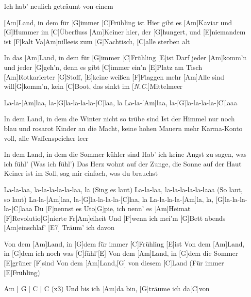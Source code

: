 

\begin{guitar}
	[\textit{N.C.}]Ich hab' neulich geträumt von einem
	
	[Am]Land, in dem für [G]immer [C]Frühling ist
	Hier gibt es [Am]Kaviar und [G]Hummer im [C]{Ü}berfluss
	[Am]Keiner hier, der [G]hungert, und [E]niemandem ist [F]kalt
	Va[Am]nilleeis zum [G]Nachtisch, [C]alle sterben alt
	
	In das [Am]Land, in dem für [G]immer [C]Frühling [E]ist
	Darf jeder [Am]komm'n und jeder [G]geh'n, denn es gibt [C]immer ein'n [E]Platz am Tisch
	[Am]Rotkarierter [G]Stoff, [E]keine weißen [F]Flaggen mehr
	[Am]Alle sind will[G]komm'n, kein [C]Boot, das sinkt im [\textit{N.C.}]Mittelmeer
	
	La-la-[Am]laa, la-[G]la-la-la-la-[C]laa, la
	La-la-[Am]laa, la-[G]la-la-la-la-[C]laaa
	
	In dem Land, in dem die Winter nicht so trübe sind
	Ist der Himmel nur noch blau und rosarot
	Kinder an die Macht, keine hohen Mauern mehr
	Karma-Konto voll, alle Waffenspeicher leer
	
	In dem Land, in dem die Sommer kühler sind
	Hab' ich keine Angst zu sagen, was ich fühl' (Was ich fühl')
	Das Herz wohnt auf der Zunge, die Sonne auf der Haut
	Keiner ist im Soll, sag mir einfach, was du brauchst
	
	La-la-laa, la-la-la-la-la-laa, la (Sing es laut)
	La-la-laa, la-la-la-la-la-laaa (So laut, so laut)
	La-la-[Am]laa, la-[G]la-la-la-la-[C]laa, la
	La-la-la-la-[Am]la, la, [G]la-la-la-la-[C]laaa
	\pagebreak
	Du [F]nennst es Uto[G]pie, ich nenn' es [Am]Heimat
	[F]Revolutio[G]nierte Fr[Am]eiheit
	Und [F]wenn ich mei'm [G]Bett abends [Am]einschlaf'
	[E7] Träum' ich davon
	
	Von dem [Am]Land, in [G]dem für immer [C]Frühling [E]ist
	Von dem [Am]Land, in [G]dem ich noch was [C]fühl'[E]{}
	Von dem [Am]Land, in [G]dem die Sommer [E]grüner [F]sind
	Von dem [Am]Land,[G] von diesem [C]Land (Für immer [E]Frühling)
	
	{\footnotesize Am | G | C | C (x3)}
	Und bis ich [Am]da bin, [G]träume ich da[C]von
\end{guitar}